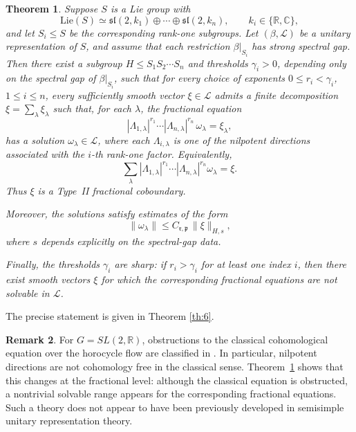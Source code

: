 \documentclass[11 pt]{amsart}
\newcommand{\RR}{\mathbb{R}}
\newcommand{\CC}{\mathbb{C}}
\newtheorem{theorem}{Theorem}[section]
\theoremstyle{definition}
\newtheorem{remark}[theorem]{Remark}
\numberwithin{equation}{section}
\def\Lie{\mathrm{Lie}}
\begin{document}
\begin{theorem}\label{th:19} Suppose \(S\) is a Lie group with
\[
\Lie(S)\simeq \mathfrak{sl}(2,k_1)\oplus\cdots\oplus \mathfrak{sl}(2,k_n),
\qquad k_i\in\{\RR,\CC\},
\]
and let \(S_i\le S\) be the corresponding rank-one subgroups. Let \((\beta,\mathcal L)\) be a unitary representation of \(S\), and assume that each restriction \(\beta|_{S_i}\) has strong spectral gap. Then there exist a subgroup \(H\le S_1S_2\cdots S_n\) and thresholds \(\gamma_i>0\), depending only on the spectral gap of $\beta|_{S_i}$, such that
for every choice of exponents \(0\le r_i<\gamma_i\), \(1\le i\le n\), every sufficiently smooth vector \(\xi\in\mathcal L\) admits a finite decomposition $\xi=\sum_{\lambda} \xi_\lambda$ such that, for each \(\lambda\), the fractional equation
\[
|\Lambda_{1,\lambda}|^{r_1}\cdots |\Lambda_{n,\lambda}|^{r_n}\,\omega_\lambda=\xi_\lambda,
\]
has a solution \(\omega_\lambda\in\mathcal L\), where each \(\Lambda_{i,\lambda}\) is one of the nilpotent directions associated with the \(i\)-th rank-one factor. Equivalently,
\[
\sum_\lambda
|\Lambda_{1,\lambda}|^{r_1}\cdots
|\Lambda_{n,\lambda}|^{r_n}\omega_\lambda
=
\xi.
\]
Thus \(\xi\) is a Type~II fractional coboundary.






Moreover, the solutions satisfy estimates of the form
\[
\|\omega_\lambda\|
\le C_{\mathfrak r,\mathfrak p}\,\|\xi\|_{H,s},
\]
where \(s\) depends explicitly on the spectral-gap data.

Finally, the thresholds \(\gamma_i\) are sharp: if \(r_i>\gamma_i\) for at least one index \(i\), then there exist smooth vectors \(\xi\) for which the corresponding fractional equations are not solvable in \(\mathcal L\).

\end{theorem}
The precise statement is given in Theorem \ref{th:6}.


\begin{remark}\label{re:3}
For \(G=SL(2,\RR)\), obstructions to the classical cohomological equation over the horocycle flow are classified in \cite{Forni}. In particular, nilpotent directions are not cohomology free in the classical sense. Theorem~\ref{th:19} shows that this changes at the fractional level: although the classical equation is obstructed, a nontrivial solvable range appears for the corresponding fractional equations. Such a theory does not appear to have been previously developed in semisimple unitary representation theory. 
\end{remark}
\end{document}
